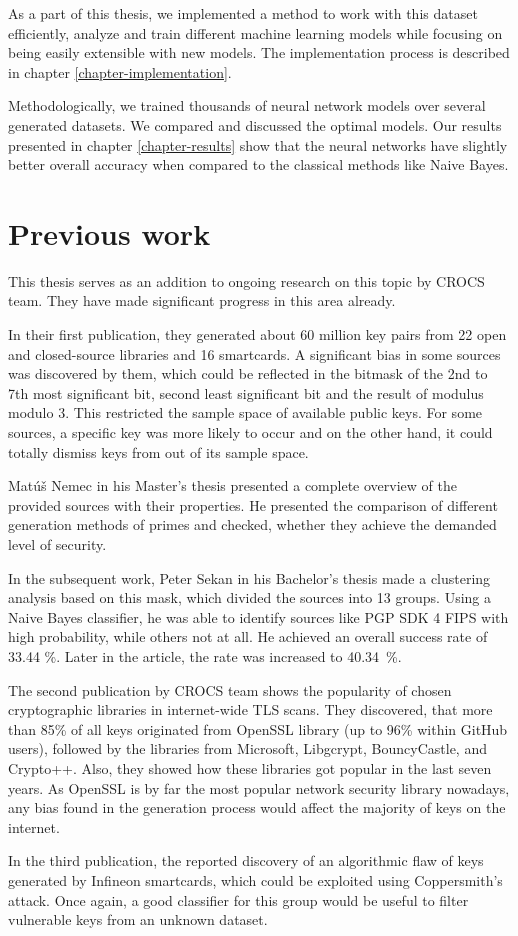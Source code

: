 As a part of this thesis, we implemented a method to work with this dataset efficiently, analyze and train different machine learning models while focusing on being easily extensible with new models. The implementation process is described in chapter \ref{chapter-implementation}.

Methodologically, we trained thousands of neural network models over several generated datasets. We compared and discussed the optimal models. Our results presented in chapter \ref{chapter-results} show that the neural networks have slightly better overall accuracy when compared to the classical methods like Naive Bayes.

\section{Previous work}
\label{chapter-prev-work}

This thesis serves as an addition to ongoing research on this topic by CROCS team. They have made significant progress in this area already. 

In their first publication\cite{svenda_1}, they generated about 60 million key pairs from 22 open and closed-source libraries and 16 smartcards. A significant bias in some sources was discovered by them, which could be reflected in the bitmask of the 2nd to 7th most significant bit, second least significant bit and the result of modulus modulo 3. This restricted the sample space of available public keys. For some sources, a specific key was more likely to occur and on the other hand, it could totally dismiss keys from out of its sample space.

Mat\'{u}š Nemec in his Master's thesis\cite{thesis_matus_nemec} presented a complete overview of the provided sources with their properties. He presented the comparison of different generation methods of primes and checked, whether they achieve the demanded level of security.

In the subsequent work, Peter Sekan in his Bachelor's thesis\cite{thesis_sekan} made a clustering analysis based on this mask, which divided the sources into 13 groups. Using a Naive Bayes classifier, he was able to identify sources like PGP SDK 4 FIPS with high probability, while others not at all. He achieved an overall success rate of 33.44 \%. Later in the article\cite{svenda_1}, the rate was increased to 40.34~\%.

The second publication by CROCS team\cite{svenda_3} shows the popularity of chosen cryptographic libraries in internet-wide TLS scans. They discovered, that more than 85\% of all keys originated from OpenSSL library (up to 96\% within GitHub users), followed by the libraries from Microsoft, Libgcrypt, BouncyCastle, and Crypto++. Also, they showed how these libraries got popular in the last seven years. As OpenSSL is by far the most popular network security library nowadays, any bias found in the generation process would affect the majority of keys on the internet.

In the third publication\cite{svenda_2}, the reported discovery of an algorithmic flaw of keys generated by Infineon smartcards, which could be exploited using Coppersmith's attack. Once again, a good classifier for this group would be useful to filter vulnerable keys from an unknown dataset.

